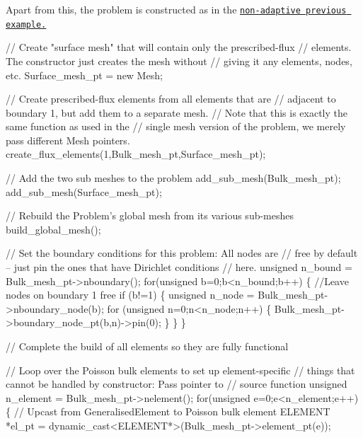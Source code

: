Apart from this, the problem is constructed as in the \href{../../two_d_poisson_flux_bc2/html/index.html#constructor}{\tt non-\/adaptive previous example.}


\begin{DoxyCodeInclude}
  
 \textcolor{comment}{// Create "surface mesh" that will contain only the prescribed-flux }
 \textcolor{comment}{// elements. The constructor just creates the mesh without}
 \textcolor{comment}{// giving it any elements, nodes, etc.}
 Surface\_mesh\_pt = \textcolor{keyword}{new} Mesh;

 \textcolor{comment}{// Create prescribed-flux elements from all elements that are }
 \textcolor{comment}{// adjacent to boundary 1, but add them to a separate mesh.}
 \textcolor{comment}{// Note that this is exactly the same function as used in the }
 \textcolor{comment}{// single mesh version of the problem, we merely pass different Mesh pointers.}
 create\_flux\_elements(1,Bulk\_mesh\_pt,Surface\_mesh\_pt);

 \textcolor{comment}{// Add the two sub meshes to the problem}
 add\_sub\_mesh(Bulk\_mesh\_pt);
 add\_sub\_mesh(Surface\_mesh\_pt);

 \textcolor{comment}{// Rebuild the Problem's global mesh from its various sub-meshes}
 build\_global\_mesh();


 \textcolor{comment}{// Set the boundary conditions for this problem: All nodes are}
 \textcolor{comment}{// free by default -- just pin the ones that have Dirichlet conditions}
 \textcolor{comment}{// here. }
 \textcolor{keywordtype}{unsigned} n\_bound = Bulk\_mesh\_pt->nboundary();
 \textcolor{keywordflow}{for}(\textcolor{keywordtype}{unsigned} b=0;b<n\_bound;b++)
  \{
   \textcolor{comment}{//Leave nodes on boundary 1 free}
   \textcolor{keywordflow}{if} (b!=1)
    \{
     \textcolor{keywordtype}{unsigned} n\_node = Bulk\_mesh\_pt->nboundary\_node(b);
     \textcolor{keywordflow}{for} (\textcolor{keywordtype}{unsigned} n=0;n<n\_node;n++)
      \{
       Bulk\_mesh\_pt->boundary\_node\_pt(b,n)->pin(0); 
      \}
    \}
  \}

 \textcolor{comment}{// Complete the build of all elements so they are fully functional}

 \textcolor{comment}{// Loop over the Poisson bulk elements to set up element-specific }
 \textcolor{comment}{// things that cannot be handled by constructor: Pass pointer to }
 \textcolor{comment}{// source function}
 \textcolor{keywordtype}{unsigned} n\_element = Bulk\_mesh\_pt->nelement();
 \textcolor{keywordflow}{for}(\textcolor{keywordtype}{unsigned} e=0;e<n\_element;e++)
  \{
   \textcolor{comment}{// Upcast from GeneralisedElement to Poisson bulk element}
   ELEMENT *el\_pt = \textcolor{keyword}{dynamic\_cast<}ELEMENT*\textcolor{keyword}{>}(Bulk\_mesh\_pt->element\_pt(e));


\end{DoxyCodeInclude}
